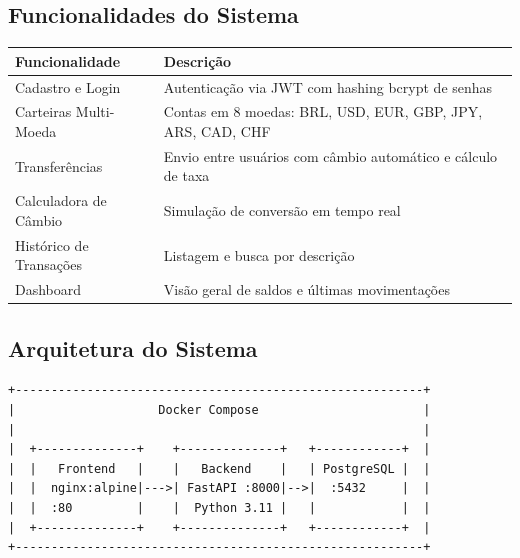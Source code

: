 \documentclass[12pt,a4paper]{article}
\begin{document}
\subsection{Funcionalidades do Sistema}
\begin{table}[h]
\centering
\begin{tabularx}{\textwidth}{|l|X|}
\hline
\textbf{Funcionalidade} & \textbf{Descrição} \\ \hline
Cadastro e Login & Autenticação via JWT com hashing bcrypt de senhas \\ \hline
Carteiras Multi-Moeda & Contas em 8 moedas: BRL, USD, EUR, GBP, JPY, ARS, CAD, CHF \\ \hline
Transferências & Envio entre usuários com câmbio automático e cálculo de taxa \\ \hline
Calculadora de Câmbio & Simulação de conversão em tempo real \\ \hline
Histórico de Transações & Listagem e busca por descrição \\ \hline
Dashboard & Visão geral de saldos e últimas movimentações \\ \hline
\end{tabularx}
\end{table}

\subsection{Arquitetura do Sistema}
\begin{verbatim}
+---------------------------------------------------------+
|                    Docker Compose                       |
|                                                         |
|  +--------------+    +--------------+   +------------+  |
|  |   Frontend   |    |   Backend    |   | PostgreSQL |  |
|  |  nginx:alpine|--->| FastAPI :8000|-->|  :5432     |  |
|  |  :80         |    |  Python 3.11 |   |            |  |
|  +--------------+    +--------------+   +------------+  |
+---------------------------------------------------------+
\end{verbatim}
\end{document}
